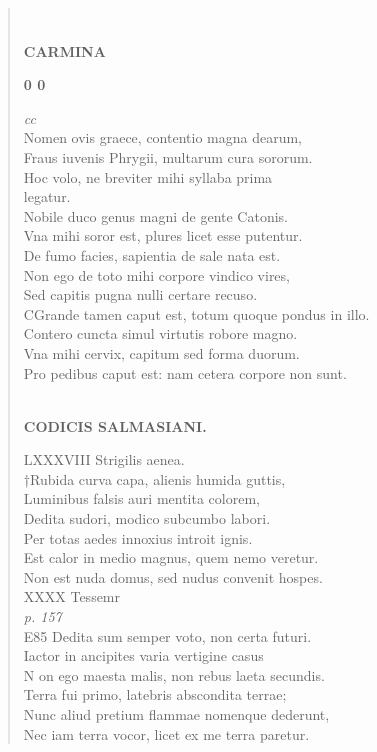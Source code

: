 \documentclass[11pt, a4paper]{report}
\begin{document}
\begin{verse}
        ﻿\pagebreak 
    \begin{center} \textbf{CARMINA} \end{center}\begin{center} \textbf{0 0} \end{center}\textit{cc} \\ Nomen ovis graece, contentio magna dearum, \\ Fraus iuvenis Phrygii, multarum cura sororum. \\ Hoc volo, ne breviter mihi syllaba prima \\ legatur. \\ Nobile duco genus magni de gente Catonis. \\ Vna mihi soror est, plures licet esse putentur. \\ De fumo facies, sapientia de sale nata est. \\ Non ego de toto mihi corpore vindico vires, \\ Sed capitis pugna nulli certare recuso. \\ CGrande tamen caput est, totum quoque pondus in illo. \\ Contero cuncta simul virtutis robore magno. \\ Vna mihi cervix, capitum sed forma duorum. \\ Pro pedibus caput est: nam cetera corpore non sunt. \\ 
        ﻿\pagebreak 
    \begin{center} \textbf{CODICIS SALMASIANI.} \end{center} \marginpar{[01]} LXXXVIII Strigilis aenea. \\ †Rubida curva capa, alienis humida guttis, \\ Luminibus falsis auri mentita colorem, \\ Dedita sudori, modico subcumbo labori. \\ Per totas aedes innoxius introit ignis. \\ Est calor in medio magnus, quem nemo veretur. \\ Non est nuda domus, sed nudus convenit hospes. \\ XXXX Tessemr \\ \textit{p. 157} \\ E85 Dedita sum semper voto, non certa futuri. \\ Iactor in ancipites varia vertigine casus \\ N on ego maesta malis, non rebus laeta secundis. \\ Terra fui primo, latebris abscondita terrae; \\ Nunc aliud pretium flammae nomenque dederunt, \\ Nec iam terra vocor, licet ex me terra paretur. \\ 

\end{verse}
\end{document}

